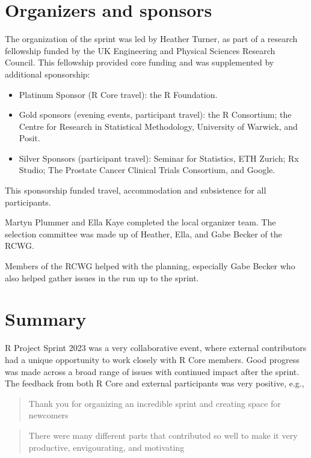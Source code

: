 \hypertarget{organizers-and-sponsors}{%
\section{Organizers and sponsors}\label{organizers-and-sponsors}}

The organization of the sprint was led by Heather Turner, as part of a
research fellowship funded by the UK Engineering and Physical Sciences Research Council. This fellowship provided core funding and was supplemented by additional sponsorship:

\begin{itemize}
\tightlist
\item
  Platinum Sponsor (R Core travel): the R Foundation.
\item
  Gold sponsors (evening events, participant travel): the R Consortium; the Centre for Research in Statistical Methodology, University of Warwick, and Posit.
\item
  Silver Sponsors (participant travel): Seminar for Statistics, ETH Zurich; Rx Studio; The Prostate Cancer Clinical Trials Consortium, and Google.
\end{itemize}

\noindent
This sponsorship funded travel, accommodation and subsistence for all participants.

Martyn Plummer and Ella Kaye completed the local organizer team. The selection committee was made up of Heather, Ella, and Gabe Becker of the RCWG.

Members of the RCWG helped with the planning, especially Gabe Becker who also helped gather issues in the run up to the sprint.

\hypertarget{summary}{%
\section{Summary}\label{summary}}

R Project Sprint 2023 was a very collaborative event, where external contributors had a unique opportunity to work closely with R Core members. Good progress was made across a broad range of issues with continued impact after the sprint. The feedback from both R Core and external participants was very positive, e.g.,

\begin{quote}
Thank you for organizing an incredible sprint and creating space for newcomers
\end{quote}

\begin{quote}
There were many different parts that contributed so well to
make it very productive, envigourating, and motivating
\end{quote}

